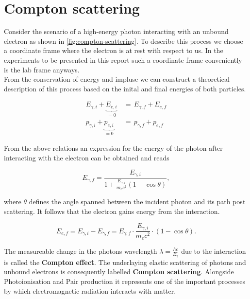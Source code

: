 
\section{Compton scattering}
\label{sec:compton-scattering}

Consider the scenario of a high-energy photon interacting with an unbound electron as
shown in \autoref{fig:compton-scattering}. To describe this process we choose a
coordinate frame where the electron is at rest with respect to us. In the experiments
to be presented in this report such a coordinate frame conveniently is the lab frame
anyways. \\
From the conservation of energy and impluse we can construct a theoretical
description of this process based on the inital and final energies of both particles.

\begin{align*}
E_{\gamma,i} + \underbrace{E_{e,i}}_{=0}\,&=\,E_{\gamma,f}+E_{e,f} \\
p_{\gamma,i} + \underbrace{p_{e,i}}_{=0}\,&=\,p_{\gamma,f}+p_{e,f}
\end{align*}

From the above relations an expression for the energy of the photon after interacting
with the electron can be obtained and reads

\begin{equation}
\label{eq:photon-energy}
E_{\gamma,f}=\frac{E_{\gamma,i}}{1+\frac{E_{\gamma,i}}{m_e c^2}(1-\cos\theta)},
\end{equation}

where $\theta$ defines the angle spanned between the incident photon and its path
post scattering. It follows that the electron gains energy from the interaction.

\begin{equation}
\label{eq:electron-energy}
E_{e,f}=E_{\gamma,i}-E_{\gamma,f}=E_{\gamma,f}\cdot\frac{E_{\gamma,i}}{m_e c^2}\cdot(1-\cos\theta).
\end{equation}

The measureable change in the photons wavelength $\lambda=\frac{hc}{E_{\gamma}}$
due to the interaction is called the \textbf{Compton effect}. The underlaying elastic
scattering of photons and unbound electrons is consequently labelled \textbf{Compton
scattering}. Alongside Photoionisation and Pair production it represents one of the
important processes by which electromagnetic radiation interacts with matter.

